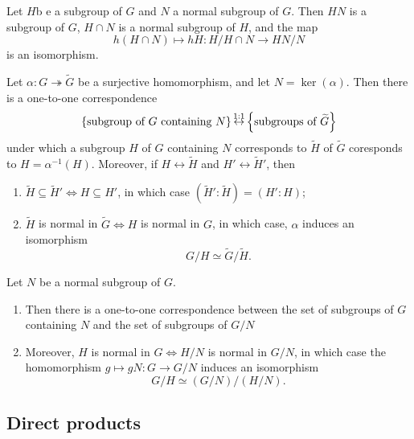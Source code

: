 \begin{theorem}[Isomorphism]
  Let \( H \)b e a subgroup of \( G \) and \( N \) a normal subgroup of \( G \).
  Then \( HN \) is a subgroup of \( G \), \( H \cap N \) is a normal subgroup of \( H \), and the map
  \[
    h(H \cap N) \mapsto hH: H / H \cap N \to HN / N
  \]
  is an isomorphism.
\end{theorem}

\begin{theorem}[Correspondence]
  Let \( \alpha: G \twoheadrightarrow \widetilde{G} \) be a surjective homomorphism, and let \( N = \ker(\alpha) \).
  Then there is a one-to-one correspondence
  \[
    \left\lbrace \textmd{subgroup of } G \textmd{ containing }N \right\rbrace \mathop{\leftrightarrow}\limits^{1:1} \left\lbrace \textmd{subgroups of } \widetilde{G} \right\rbrace
  \]
  under which a subgroup \( H \) of \( G \) containing \( N \) corresponds to \( \widetilde{H} \) of \( \widetilde{G} \) coresponds to \( H = \alpha^{-1}(H) \).
  Moreover, if \( H \leftrightarrow \widetilde{H} \) and \( H' \leftrightarrow \widetilde{H}' \), then
  \begin{enumerate}
    \item \( \widetilde{H} \subseteq \widetilde{H}' \iff H \subseteq H' \), in which case \( (\widetilde{H}': \widetilde{H}) = (H' : H) \);
    \item \( \widetilde{H} \) is normal in \( \widetilde{G} \iff H \) is normal in \( G \), in which case, \( \alpha \) induces an isomorphism
      \[
        G / H \simeq \widetilde{G} / \widetilde{H}.
      \]
  \end{enumerate}
\end{theorem}

\begin{corollary}
  Let \( N \) be a normal subgroup of \( G \).
  \begin{enumerate}
    \item Then there is a one-to-one correspondence between the set of subgroups of \( G \) containing \( N \) and the set of subgroups of \( G / N \)
    \item Moreover, \( H \) is normal in \( G \iff H / N \) is normal in \( G / N \), in which case the homomorphism \( g \mapsto gN: G \to G / N \) induces an isomorphism
      \[
        G / H \simeq (G / N) / (H / N).
      \]
  \end{enumerate}
\end{corollary}

\subsection{Direct products}

